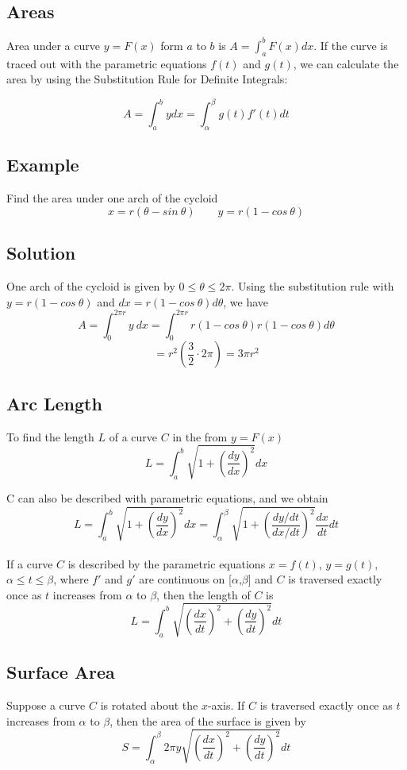\subsection*{Areas}
Area under a curve $y = F(x)$ form $a$ to $b$ is $A = \int_a^b F(x) dx$.
If the curve is traced out with the parametric equations $f(t)$ and $g(t)$,
we can calculate the area by using the Substitution Rule for Definite Integrals:

$$A=\int_a^b ydx = \int_\alpha^\beta g(t)f'(t)dt$$

\subsection*{Example}
Find the area under one arch of the cycloid
$$x=r(\theta-sin\: \theta) \qquad y=r(1-cos\: \theta)$$

\subsection*{Solution}
One arch of the cycloid is given by $0\leq \theta \leq 2\pi$. Using the substitution
rule with $y=r(1-cos\: \theta)$ and $dx=r(1-cos\: \theta)d\theta$, we have
$$A=\int_0^{2\pi r}y\: dx=\int_0^{2\pi r}r(1-cos\: \theta)r(1-cos\: \theta)d\theta$$
$$=r^2(\frac{3}{2}\cdot 2\pi)=3\pi r^2$$

\subsection*{Arc Length}
To find the length $L$ of a curve $C$ in the from $y=F(x)$
$$ L = \int_a^b \sqrt{1+(\frac{dy}{dx})^2} dx $$

C can also be described with parametric equations, and we obtain
$$ L = \int_a^b \sqrt{1+\left(\frac{dy}{dx}\right)^2} dx = \int_\alpha^\beta \sqrt{1+(\frac{dy/dt}{dx/dt})^2}\frac{dx}{dt}dt $$\\

If a curve $C$ is described by the parametric equations $x=f(t)$, $y=g(t)$,
$\alpha \leq t \leq \beta$, where $f'$ and $g'$ are continuous on [$\alpha$,$\beta$]
and $C$ is traversed exactly once as $t$ increases from $\alpha$ to $\beta$, then
the length of $C$ is\\
$$ L = \int_a^b \sqrt{\left(\frac{dx}{dt}\right)^2+\left(\frac{dy}{dt}\right)^2} dt $$

\subsection*{Surface Area}
Suppose a curve $C$ is rotated about the $x$-axis. If $C$ is traversed exactly
once as $t$ increases from $\alpha$ to $\beta$, then the area of the surface is given by
$$ S = \int_\alpha^\beta 2 \pi y \sqrt{\left(\frac{dx}{dt}\right)^2+\left(\frac{dy}{dt}\right)^2} dt $$

